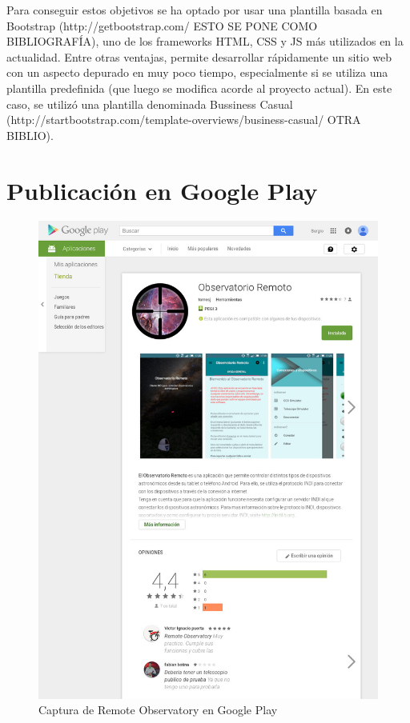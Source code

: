 Para conseguir estos objetivos se ha optado por usar una plantilla basada en Bootstrap (http://getbootstrap.com/ ESTO SE PONE COMO BIBLIOGRAFÍA), uno de los frameworks HTML, CSS y JS más utilizados en la actualidad. Entre otras ventajas, permite desarrollar rápidamente un sitio web con un aspecto depurado en muy poco tiempo, especialmente si se utiliza una plantilla predefinida (que luego se modifica acorde al proyecto actual). En este caso, se utilizó una plantilla denominada Bussiness Casual (http://startbootstrap.com/template-overviews/business-casual/ OTRA BIBLIO).



\section{Publicación en Google Play}

\begin{figure}
 \centering
 \includegraphics[width=12cm]{../images/googlePlay.jpg}
 \caption{Captura de Remote Observatory en Google Play}
 \label{fig:googlePlay}
\end{figure}

